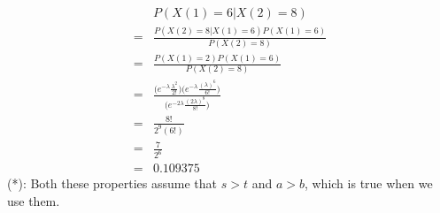 \documentclass[14pt,letterpaper]{extarticle}
\begin{document}
\begin{center}
\begin{enumerate}
\begin{enumerate}
        \begin{align*}
            & P(X(1)=6|X(2)=8) \\
            = & \frac{P(X(2)=8|X(1)=6)P(X(1)=6)}{P(X(2)=8)} \\
            = & \frac{P(X(1)=2)P(X(1)=6)}{P(X(2)=8)} \\
            = & \frac{\big(e^{-\lambda }\frac{\lambda ^2}{2!}\big)\big(e^{-\lambda }\frac{(\lambda )^6}{6!}\big)}{\big(e^{-2\lambda }\frac{(2\lambda )^8}{8!}\big)} \\
            = & \frac{8!}{2^9(6!)} \\
            = & \frac{7}{2^6} \\
            = & 0.109375
        \end{align*}
        (*): Both these properties assume that $s>t$ and $a>b$, which is true when we use them.
    \end{enumerate}
\end{enumerate}
\end{center}
\end{document}
